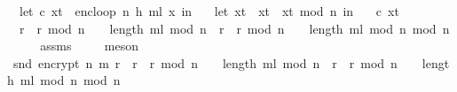 \begin{isabellebody}
\ \ let\ {\isacharparenleft}{\kern0pt}c{\isacharcomma}{\kern0pt}\ x{\isacharunderscore}{\kern0pt}t{\isacharparenright}{\kern0pt}\ {\isacharequal}{\kern0pt}\ enc{\isacharunderscore}{\kern0pt}loop\ {\isacharparenleft}{\kern0pt}n{\isacharcomma}{\kern0pt}\ h{\isacharcomma}{\kern0pt}\ m{\isacharunderscore}{\kern0pt}l{\isacharparenright}{\kern0pt}\ x{\isacharunderscore}{\kern0pt}{}\ in\ \isanewline
\ \ let\ x{\isacharunderscore}{\kern0pt}t{\isacharprime}{\kern0pt}\ {\isacharequal}{\kern0pt}\ x{\isacharunderscore}{\kern0pt}t\ {\isacharasterisk}{\kern0pt}\ x{\isacharunderscore}{\kern0pt}t\ mod\ n\ in\ \isanewline
\ \ {\isacharparenleft}{\kern0pt}c{\isacharcomma}{\kern0pt}\ x{\isacharunderscore}{\kern0pt}t{\isacharprime}{\kern0pt}{\isacharparenright}{\kern0pt}{\isacharparenright}{\kern0pt}\isanewline
\ \ {\isacharequal}{\kern0pt}\ \isanewline
\ \ {\isacharparenleft}{\kern0pt}{\isacharparenleft}{\kern0pt}{\isacharparenleft}{\kern0pt}r\ {\isacharasterisk}{\kern0pt}\ r{\isacharparenright}{\kern0pt}\ mod\ n{\isacharparenright}{\kern0pt}\ {\isacharcircum}{\kern0pt}\ {\isacharparenleft}{\kern0pt}{}\ {\isacharcircum}{\kern0pt}\ {\isacharparenleft}{\kern0pt}length\ m{\isacharunderscore}{\kern0pt}l{\isacharparenright}{\kern0pt}{\isacharparenright}{\kern0pt}\ mod\ n{\isacharparenright}{\kern0pt}\ {\isacharasterisk}{\kern0pt}\ {\isacharparenleft}{\kern0pt}{\isacharparenleft}{\kern0pt}{\isacharparenleft}{\kern0pt}r\ {\isacharasterisk}{\kern0pt}\ r{\isacharparenright}{\kern0pt}\ mod\ n{\isacharparenright}{\kern0pt}\ {\isacharcircum}{\kern0pt}\ {\isacharparenleft}{\kern0pt}{}\ {\isacharcircum}{\kern0pt}\ {\isacharparenleft}{\kern0pt}length\ m{\isacharunderscore}{\kern0pt}l{\isacharparenright}{\kern0pt}{\isacharparenright}{\kern0pt}\ mod\ n{\isacharparenright}{\kern0pt}\ mod\ n{\isachardoublequoteclose}\ \isanewline
\ \ \isamarkupfalse%
\ assms\ \isanewline
\ \ \isamarkupfalse%
\ meson\isanewline
\isanewline
\ \ \isamarkupfalse%
\ \isamarkupfalse%
\ {\isachardoublequoteopen}snd\ {\isacharparenleft}{\kern0pt}encrypt\ n\ m\ r{\isacharparenright}{\kern0pt}\ {\isacharequal}{\kern0pt}\ {\isacharparenleft}{\kern0pt}{\isacharparenleft}{\kern0pt}{\isacharparenleft}{\kern0pt}r\ {\isacharasterisk}{\kern0pt}\ r{\isacharparenright}{\kern0pt}\ mod\ n{\isacharparenright}{\kern0pt}\ {\isacharcircum}{\kern0pt}\ {\isacharparenleft}{\kern0pt}{}\ {\isacharcircum}{\kern0pt}\ {\isacharparenleft}{\kern0pt}length\ m{\isacharunderscore}{\kern0pt}l{\isacharparenright}{\kern0pt}{\isacharparenright}{\kern0pt}\ mod\ n{\isacharparenright}{\kern0pt}\ {\isacharasterisk}{\kern0pt}\ {\isacharparenleft}{\kern0pt}{\isacharparenleft}{\kern0pt}{\isacharparenleft}{\kern0pt}r\ {\isacharasterisk}{\kern0pt}\ r{\isacharparenright}{\kern0pt}\ mod\ n{\isacharparenright}{\kern0pt}\ {\isacharcircum}{\kern0pt}\ {\isacharparenleft}{\kern0pt}{}\ {\isacharcircum}{\kern0pt}\ {\isacharparenleft}{\kern0pt}length\ m{\isacharunderscore}{\kern0pt}l{\isacharparenright}{\kern0pt}{\isacharparenright}{\kern0pt}\ mod\ n{\isacharparenright}{\kern0pt}\ mod\ n{\isachardoublequoteclose}\ \isanewline

\end{isabellebody}
